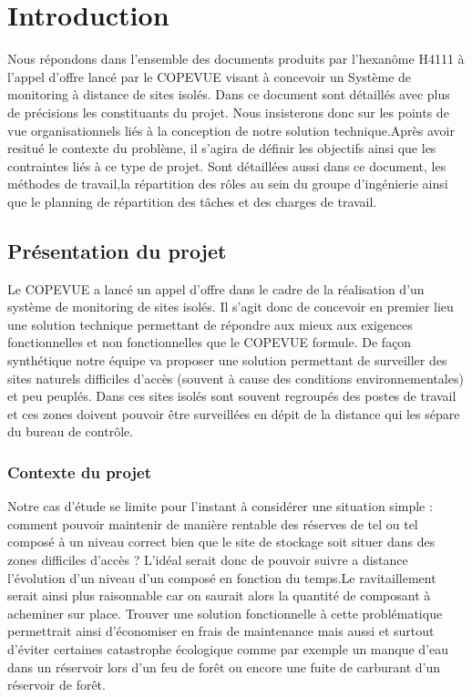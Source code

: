 \section{Introduction}
Nous répondons dans l'ensemble des documents produits par l'hexanôme H4111 à l'appel d'offre lancé par le COPEVUE visant à concevoir un Système de monitoring à distance de sites isolés. Dans ce document sont détaillés avec plus de précisions les constituants  du projet. Nous insisterons donc sur les points de vue organisationnels liés à la conception de notre solution technique.Après avoir resitué le contexte du problème, il s'agira de définir les objectifs ainsi que les contraintes liés à ce type de projet. Sont détaillées aussi dans ce document, les méthodes de travail,la répartition des rôles au sein du groupe d'ingénierie ainsi que le planning de répartition des tâches et des charges de travail. 

\subsection{Présentation du projet}
Le COPEVUE a lancé un appel d'offre dans le cadre de la réalisation d'un système de monitoring de sites isolés. Il s'agit donc de concevoir en premier lieu une solution technique permettant de répondre aux mieux aux exigences fonctionnelles et non fonctionnelles que le COPEVUE formule. De façon synthétique notre équipe va proposer une solution permettant de surveiller des sites naturels difficiles d'accès (souvent à cause des conditions environnementales) et peu peuplés. Dans ces sites isolés sont souvent regroupés des postes de travail et ces zones doivent pouvoir être surveillées en dépit de la distance qui les sépare du bureau de contrôle.

\subsubsection{Contexte du projet}
Notre cas d'étude se limite pour l'instant à considérer une situation simple : comment pouvoir maintenir de manière rentable des réserves de tel ou tel composé à un niveau correct bien que le site de stockage soit situer dans des zones difficiles d'accès ? L'idéal serait donc de pouvoir suivre a distance l'évolution d'un niveau d'un composé en fonction du temps.Le ravitaillement serait ainsi plus raisonnable car on saurait alors la quantité de composant à acheminer sur place. Trouver une solution fonctionnelle à cette problématique permettrait ainsi d'économiser en frais de maintenance mais aussi et surtout d'éviter certaines catastrophe écologique comme par exemple un manque d'eau dans un réservoir lors d'un feu de forêt ou encore une fuite de carburant d'un réservoir de forêt.

